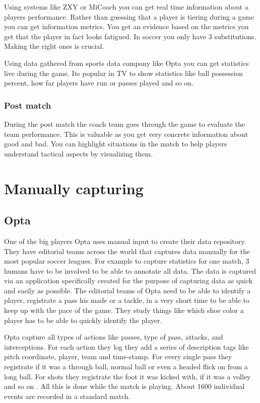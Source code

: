 Using systems like ZXY or MiCoach you can get real time information about a players performance. Rather than guessing that a player is tiering during a game you can get information metrics. You get an evidence based on the metrics you get that the player in fact looks fatigued. In soccer you only have 3 substitutions. Making the right ones is crucial.

Using data gathered from sports data company like Opta you can get statistics live during the game. Its popular in TV to show statistics like ball possession percent, how far players have run or passes played and so on. 

\subsubsection{Post match}

During the post match the coach team goes through the game to evaluate the team performance. This is valuable as you get very concrete information about good and bad. You can highlight situations in the match to help players understand tactical aspects by visualizing them.

\section{Manually capturing }

\subsection{Opta }


One of the big players Opta uses manual input to create their data repository. They have editorial teams across the world that captures data manually for the most popular soccer leagues. For example to capture statistics for one match, 3 humans have to be involved to be able to annotate all data. The data is captured via an application specifically created for the purpose of capturing data as quick and easily as possible. The editorial teams of Opta need to be able to identify a player, registrate a pass his made or a tackle, in a very short time to be able to keep up with the pace of the game. They study things like which shoe color a player has to be able to quickly identify the player.

Opta capture all types of actions like passes, type of pass, attacks, and interceptions. For each action they log they add a series of description tags like pitch coordinate, player, team and time-stamp. For every single pass they registrate if it was a through ball, normal ball or even a headed flick on from a long ball. For shots they registrate the foot it was kicked with, if it was a volley and so on . All this is done while the match is playing. About 1600 individual events are recorded in a standard match. 

